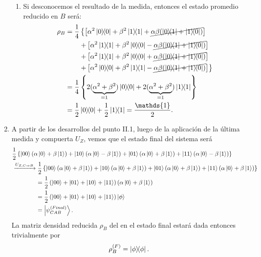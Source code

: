 \documentclass{scrartcl}
\newcommand{\inv}[1]{\frac{1}{#1}}
\DeclareRobustCommand{\[}{\begin{equation}}
\DeclareRobustCommand{\]}{\end{equation}}
\begin{document}
\begin{enumerate}
\begin{enumerate}
        
        \item Si desconocemos el resultado de la medida, entonces el estado promedio reducido en $B$ será:
        \begin{align}
            \rho_B &= \inv{4} \left\{ \left[ \alpha^2 \dyad{0}{0} + \beta^2 \dyad{1}{1} + \cancel{\alpha\beta (\dyad{0}{1} + \dyad{1}{0})} \right] \right. \\
            &\quad \quad \left. + \left[ \alpha^2 \dyad{1}{1} + \beta^2 \dyad{0}{0} - \cancel{\alpha\beta (\dyad{0}{1} + \dyad{1}{0})} \right] \right. \\
            &\quad \quad \left. + \left[ \alpha^2 \dyad{1}{1} + \beta^2 \dyad{0}{0} + \cancel{\alpha\beta (\dyad{0}{1} + \dyad{1}{0})} \right] \right. \\
            &\quad \quad \left. + \left[ \alpha^2 \dyad{0}{0} + \beta^2 \dyad{1}{1} - \cancel{\alpha\beta (\dyad{0}{1} + \dyad{1}{0})} \right] \right\} \\
            &= \inv{4} \left\{ 2(\underbrace{\alpha^2 + \beta^2}_{=1}) \dyad{0}{0} + 2(\underbrace{\alpha^2 + \beta^2}_{=1}) \dyad{1}{1} \right\} \\
            &= \inv{2} \dyad{0}{0} + \inv{2} \dyad{1}{1} = \frac{\mathds{1}}{2}.
        \end{align}
        
    \end{enumerate}
    
    
    
    \item A partir de los desarrollos del punto II.1, luego de la aplicación de la última medida y compuerta $U_Z$, vemos que el estado final del sistema será
    \begin{align}
        &\inv{2} \left\{ \ket{00} (\alpha \ket{0} + \beta \ket{1}) + \ket{10} (\alpha \ket{0} - \beta \ket{1}) + \ket{01} (\alpha \ket{0} + \beta \ket{1}) + \ket{11} (\alpha \ket{0} - \beta \ket{1}) \right\} \\
            &\xrightarrow[]{U_{Z, C \to B}} \inv{2} \left\{ \ket{00} (\alpha \ket{0} + \beta \ket{1}) + \ket{10} (\alpha \ket{0} + \beta \ket{1}) + \ket{01} (\alpha \ket{0} + \beta \ket{1}) + \ket{11} (\alpha \ket{0} + \beta \ket{1}) \right\} \\
            &\quad \quad \quad \quad = \inv{2} \left( \ket{00} + \ket{01} + \ket{10} + \ket{11} \right) (\alpha \ket{0} + \beta \ket{1}) \\
            &\quad \quad \quad \quad = \inv{2} \left( \ket{00} + \ket{01} + \ket{10} + \ket{11} \right) \ket{\phi} \\
            &\quad \quad \quad \quad = \ket{\psi^{(Final)}_{CAB}}.
    \end{align}
    La matriz densidad reducida $\rho_B$ del en el estado final estará dada entonces trivialmente por
    \[ \rho^{(F)}_B = \dyad{\phi}{\phi}. \]
    

\end{enumerate}
\end{document}

